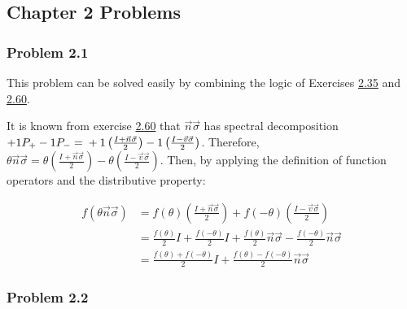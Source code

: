 \subsection{Chapter 2 Problems}
\subsubsection{Problem 2.1}
This problem can be solved easily by combining the
logic of Exercises
\hyperref[sec:nielsen-and-chuang-exercise-2-35]{2.35} and
\hyperref[sec:nielsen-and-chuang-exercise-2-60]{2.60}.

It is known from exercise \hyperref[sec:nielsen-and-chuang-exercise-2-60]{2.60}
that $\vec{n} \vec{\sigma}$ has spectral decomposition
$+1P_+ - 1P_- = \\ +1 \left( \frac{I + \vec{n}\vec{\sigma}}{2} \right)
-1 \left( \frac{I - \vec{v}\vec{\sigma}}{2} \right)$.
Therefore, $\theta \vec{n} \vec{\sigma} =
\theta \left( \frac{I + \vec{n}\vec{\sigma}}{2} \right)
- \theta \left( \frac{I - \vec{v}\vec{\sigma}}{2} \right)$.
Then, by applying the definition of function operators and
the distributive property:

\begin{align}
    f(\theta \vec{n} \vec{\sigma}) &= f(\theta) \left(
        \frac{I + \vec{n}\vec{\sigma}}{2} \right) +
        f(-\theta) \left( \frac{I - \vec{v}\vec{\sigma}}{2} \right) \\
    &= \frac{f(\theta)}{2}I + \frac{f(-\theta)}{2}I +
        \frac{f(\theta)}{2}\vec{n}\vec{\sigma} -
        \frac{f(-\theta)}{2}\vec{n}\vec{\sigma} \\
    &= \frac{f(\theta) + f(-\theta)}{2}I +
        \frac{f(\theta) - f(-\theta)}{2}\vec{n}\vec{\sigma}
\end{align}

\subsubsection{Problem 2.2}

